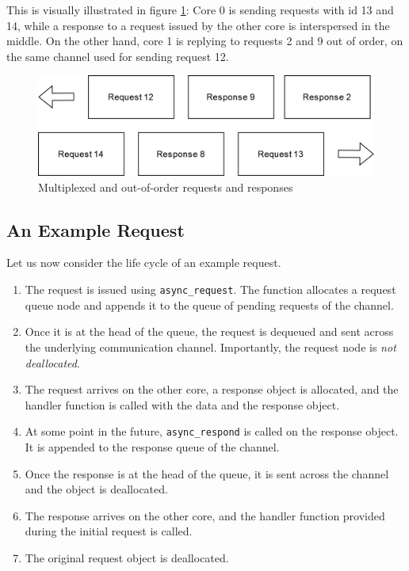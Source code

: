 This is visually illustrated in figure \ref{fig:rpc:asyncchan}: Core 0 is sending requests with id 13 and 14, while a response to a request issued by the other core is interspersed in the middle. On the other hand, core 1 is replying to requests 2 and 9 out of order, on the same channel used for sending request 12.

\begin{figure}[htp]
    \centering
    \includegraphics[width=12cm]{images/rpc/async_channel.png}
    \caption{Multiplexed and out-of-order requests and responses}
    \label{fig:rpc:asyncchan}
\end{figure}

\subsection{An Example Request}
\label{subsec:rpc:examplereq}
Let us now consider the life cycle of an example request.
\begin{enumerate}
    \item The request is issued using \texttt{async\_request}. The function allocates a request queue node and appends it to the queue of pending requests of the channel. 
    \item Once it is at the head of the queue, the request is dequeued and sent across the underlying communication channel. Importantly, the request node is \textit{not deallocated}.
    \item The request arrives on the other core, a response object is allocated, and the handler function is called with the data and the response object.
    \item At some point in the future, \texttt{async\_respond} is called on the response object. It is appended to the response queue of the channel.
    \item Once the response is at the head of the queue, it is sent across the channel and the object is deallocated.
    \item The response arrives on the other core, and the handler function provided during the initial request is called.
    \item The original request object is deallocated.
\end{enumerate}

